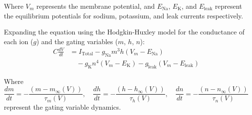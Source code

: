 \documentclass[12pt,a4paper]{report}
\begin{document}
Where $V_m$ represents the membrane potential, and $E_{\text{Na}}$, $E_{\text{K}}$, and $E_{\text{leak}}$ represent the equilibrium potentials for sodium, potassium, and leak currents respectively.

Expanding the equation using the Hodgkin-Huxley model for the conductance of each ion ($g$) and the gating variables ($m$, $h$, $n$):
\begin{align*}
C \frac{dV}{dt} & = I_{\text{Total}} - g_{\text{Na}} m^3 h (V_m - E_{\text{Na}}) \\
                 & \quad - g_{\text{K}} n^4 (V_m - E_{\text{K}}) - g_{\text{leak}} (V_m - E_{\text{leak}})
\end{align*}

Where
\[
\frac{dm}{dt} = -\frac{(m - m_{\infty}(V))}{\tau_m(V)}, \quad \frac{dh}{dt} = -\frac{(h - h_{\infty}(V))}{\tau_h(V)}, \quad \frac{dn}{dt} = -\frac{(n - n_{\infty}(V))}{\tau_n(V)}
\]
represent the gating variable dynamics.
\end{document}
